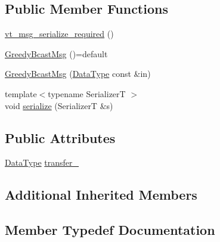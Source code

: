 \subsection*{Public Member Functions}
\begin{DoxyCompactItemize}
\item 
\hyperlink{structvt_1_1vrt_1_1collection_1_1lb_1_1_greedy_bcast_msg_abf9dfc94f27aa63f11c473726ecb4933}{vt\+\_\+msg\+\_\+serialize\+\_\+required} ()
\item 
\hyperlink{structvt_1_1vrt_1_1collection_1_1lb_1_1_greedy_bcast_msg_ad5e17f7c8d56c12257cdb5ff69f3c335}{Greedy\+Bcast\+Msg} ()=default
\item 
\hyperlink{structvt_1_1vrt_1_1collection_1_1lb_1_1_greedy_bcast_msg_a38612d8b826d6c839a2bfc13edc1db75}{Greedy\+Bcast\+Msg} (\hyperlink{structvt_1_1vrt_1_1collection_1_1lb_1_1_greedy_bcast_msg_a56f882aadc6658debe93c6523b4e524f}{Data\+Type} const \&in)
\item 
{\footnotesize template$<$typename SerializerT $>$ }\\void \hyperlink{structvt_1_1vrt_1_1collection_1_1lb_1_1_greedy_bcast_msg_a4c62ca153e7337d26ef074383aa6079f}{serialize} (SerializerT \&s)
\end{DoxyCompactItemize}
\subsection*{Public Attributes}
\begin{DoxyCompactItemize}
\item 
\hyperlink{structvt_1_1vrt_1_1collection_1_1lb_1_1_greedy_bcast_msg_a56f882aadc6658debe93c6523b4e524f}{Data\+Type} \hyperlink{structvt_1_1vrt_1_1collection_1_1lb_1_1_greedy_bcast_msg_aa26f7bccf46005de9ab18799225f4eff}{transfer\+\_\+}
\end{DoxyCompactItemize}
\subsection*{Additional Inherited Members}


\subsection{Member Typedef Documentation}
\mbox{\label{structvt_1_1vrt_1_1collection_1_1lb_1_1_greedy_bcast_msg_a56f882aadc6658debe93c6523b4e524f}} 
